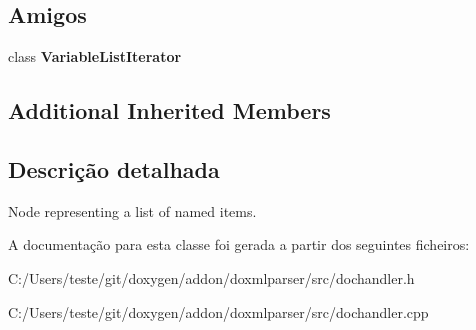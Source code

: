 \subsection*{Amigos}
\begin{DoxyCompactItemize}
\item 
\hypertarget{class_variable_list_handler_a8c090f1bc8d2b072a4be8ce5b4571421}{class {\bfseries Variable\-List\-Iterator}}\label{class_variable_list_handler_a8c090f1bc8d2b072a4be8ce5b4571421}

\end{DoxyCompactItemize}
\subsection*{Additional Inherited Members}


\subsection{Descrição detalhada}
Node representing a list of named items. 



A documentação para esta classe foi gerada a partir dos seguintes ficheiros\-:\begin{DoxyCompactItemize}
\item 
C\-:/\-Users/teste/git/doxygen/addon/doxmlparser/src/dochandler.\-h\item 
C\-:/\-Users/teste/git/doxygen/addon/doxmlparser/src/dochandler.\-cpp\end{DoxyCompactItemize}
